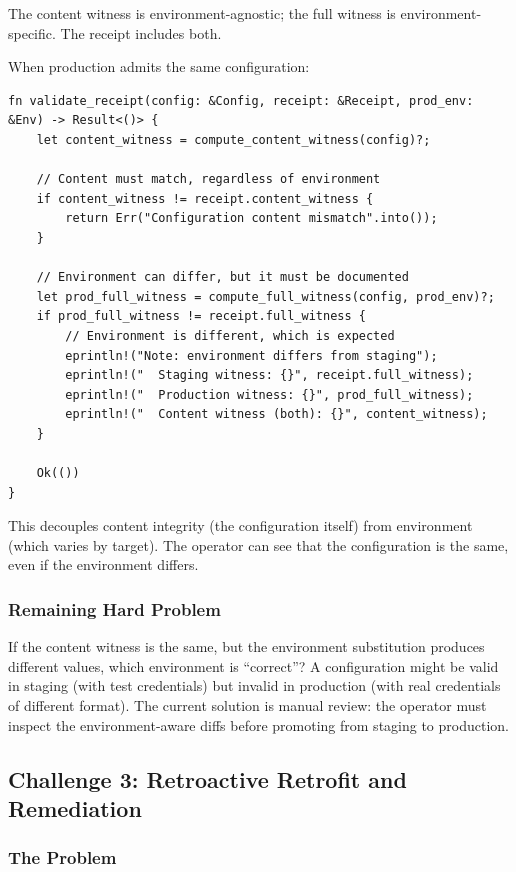 The content witness is environment-agnostic; the full witness is environment-specific. The receipt includes both.

When production admits the same configuration:

\begin{lstlisting}[caption={Environment-aware witness validation}]
fn validate_receipt(config: &Config, receipt: &Receipt, prod_env: &Env) -> Result<()> {
    let content_witness = compute_content_witness(config)?;

    // Content must match, regardless of environment
    if content_witness != receipt.content_witness {
        return Err("Configuration content mismatch".into());
    }

    // Environment can differ, but it must be documented
    let prod_full_witness = compute_full_witness(config, prod_env)?;
    if prod_full_witness != receipt.full_witness {
        // Environment is different, which is expected
        eprintln!("Note: environment differs from staging");
        eprintln!("  Staging witness: {}", receipt.full_witness);
        eprintln!("  Production witness: {}", prod_full_witness);
        eprintln!("  Content witness (both): {}", content_witness);
    }

    Ok(())
}
\end{lstlisting}

This decouples content integrity (the configuration itself) from environment (which varies by target). The operator can see that the configuration is the same, even if the environment differs.

\subsubsection{Remaining Hard Problem}

If the content witness is the same, but the environment substitution produces different values, which environment is ``correct''? A configuration might be valid in staging (with test credentials) but invalid in production (with real credentials of different format). The current solution is manual review: the operator must inspect the environment-aware diffs before promoting from staging to production.

\subsection{Challenge 3: Retroactive Retrofit and Remediation}

\subsubsection{The Problem}

